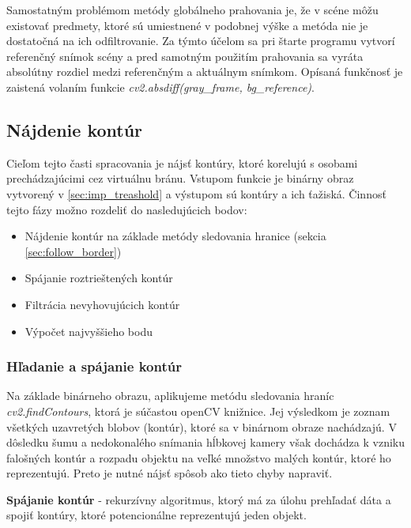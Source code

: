 Samostatným problémom metódy globálneho prahovania je, že v scéne môžu existovať predmety, ktoré sú umiestnené v podobnej výške a metóda nie je dostatočná na ich odfiltrovanie. Za týmto účelom sa pri štarte programu vytvorí referenčný snímok scény a pred samotným použitím prahovania sa vyráta absolútny rozdiel medzi referenčným a aktuálnym snímkom. Opísaná funkčnosť je zaistená volaním funkcie \textit{cv2.absdiff(gray\_frame, bg\_reference)}.


\subsection{Nájdenie kontúr}
Cieľom tejto časti spracovania je nájsť kontúry, ktoré korelujú s osobami prechádzajúcimi cez virtuálnu bránu. Vstupom funkcie je binárny obraz vytvorený v \ref{sec:imp_treashold} a výstupom sú kontúry a ich  ťažiská. Činnosť tejto fázy možno rozdeliť do nasledujúcich bodov:  
\begin{itemize}
\item Nájdenie kontúr na základe metódy sledovania hranice (sekcia \ref{sec:follow_border})
\item Spájanie roztrieštených kontúr
\item Filtrácia nevyhovujúcich kontúr
\item Výpočet najvyššieho bodu 
\end{itemize}
\vspace{5mm}

\subsubsection{Hľadanie a spájanie kontúr}
Na základe binárneho obrazu, aplikujeme metódu sledovania hraníc \textit{cv2.findContours}, ktorá je súčastou openCV knižnice. Jej výsledkom je zoznam všetkých uzavretých blobov (kontúr), ktoré sa v binárnom obraze nachádzajú. V dôsledku šumu a nedokonalého snímania hĺbkovej kamery však dochádza k vzniku falošných kontúr a rozpadu objektu na veľké množstvo malých kontúr, ktoré ho reprezentujú. Preto je nutné nájsť spôsob ako tieto chyby napraviť. \vspace{5mm}

\textbf{Spájanie kontúr} - rekurzívny algoritmus, ktorý má za úlohu prehľadať dáta a spojiť kontúry, ktoré potencionálne reprezentujú jeden objekt. 

